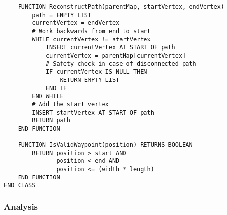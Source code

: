 \begin{verbatim}
    FUNCTION ReconstructPath(parentMap, startVertex, endVertex)
        path = EMPTY LIST
        currentVertex = endVertex
        # Work backwards from end to start
        WHILE currentVertex != startVertex
            INSERT currentVertex AT START OF path
            currentVertex = parentMap[currentVertex]
            # Safety check in case of disconnected path
            IF currentVertex IS NULL THEN
                RETURN EMPTY LIST
            END IF
        END WHILE
        # Add the start vertex
        INSERT startVertex AT START OF path
        RETURN path
    END FUNCTION

    FUNCTION IsValidWaypoint(position) RETURNS BOOLEAN
        RETURN position > start AND 
               position < end AND 
               position <= (width * length)
    END FUNCTION
END CLASS
\end{verbatim}

\newpage

\subsubsection{Analysis}

